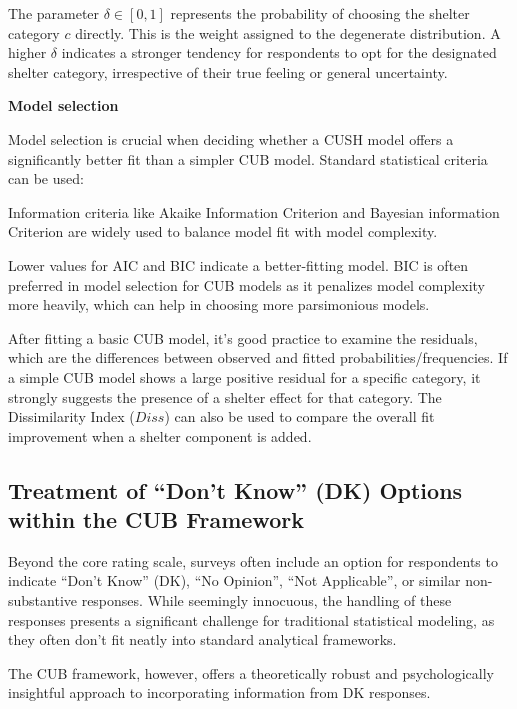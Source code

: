 \documentclass[
  letterpaper,
  DIV=11,
  numbers=noendperiod]{scrartcl}
\begin{document}
The parameter \(\delta \in [0,1]\) represents the probability of
choosing the shelter category \(c\) directly. This is the weight
assigned to the degenerate distribution. A higher \(\delta\) indicates a
stronger tendency for respondents to opt for the designated shelter
category, irrespective of their true feeling or general uncertainty.

\textbf{Model selection}

Model selection is crucial when deciding whether a CUSH model offers a
significantly better fit than a simpler CUB model. Standard statistical
criteria can be used:

Information criteria like Akaike Information Criterion and Bayesian
information Criterion are widely used to balance model fit with model
complexity.

Lower values for AIC and BIC indicate a better-fitting model. BIC is
often preferred in model selection for CUB models as it penalizes model
complexity more heavily, which can help in choosing more parsimonious
models.

After fitting a basic CUB model, it's good practice to examine the
residuals, which are the differences between observed and fitted
probabilities/frequencies. If a simple CUB model shows a large positive
residual for a specific category, it strongly suggests the presence of a
shelter effect for that category. The Dissimilarity Index (\(Diss\)) can
also be used to compare the overall fit improvement when a shelter
component is added.

\hypertarget{treatment-of-dont-know-dk-options-within-the-cub-framework}{%
\subsection{Treatment of ``Don't Know'' (DK) Options within the CUB
Framework}\label{treatment-of-dont-know-dk-options-within-the-cub-framework}}

Beyond the core rating scale, surveys often include an option for
respondents to indicate ``Don't Know'' (DK), ``No Opinion'', ``Not
Applicable'', or similar non-substantive responses. While seemingly
innocuous, the handling of these responses presents a significant
challenge for traditional statistical modeling, as they often don't fit
neatly into standard analytical frameworks.

The CUB framework, however, offers a theoretically robust and
psychologically insightful approach to incorporating information from DK
responses.
\end{document}
